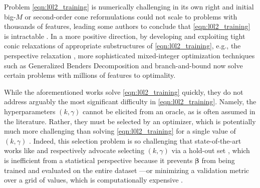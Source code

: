\documentclass[opre,nonblindrev]{informs3} %
\begin{document}
Problem \eqref{eqn:l0l2_training} is numerically challenging in its own right and initial big-$M$ \citep{bertsimas2016best} or second-order cone \citep{miyashiro2015mixed} reformulations could not scale to problems with thousands of features, leading some authors to conclude that \eqref{eqn:l0l2_training} is intractable \citep[][]{hastie2020best}. In a more positive direction, by developing and exploiting tight conic relaxations of appropriate substructures of \eqref{eqn:l0l2_training}, e.g., the perspective relaxation \citep{ceria1999convex, frangioni2006perspective,gunluk2010perspective}%
, more sophisticated mixed-integer optimization techniques such as Generalized Benders Decomposition \citep{bertsimas2020sparse} and branch-and-bound \citep{hazimeh2021sparse} now solve certain problems with millions of features to optimality.%


While the aforementioned works solve \eqref{eqn:l0l2_training} quickly, they do not address arguably the most significant difficulty in \eqref{eqn:l0l2_training}. Namely, the hyperparameters $(k, \gamma)$ cannot be elicited from an oracle, as is often assumed in the literature. Rather, they must be selected by an optimizer, which is potentially much more challenging than solving \eqref{eqn:l0l2_training} for a single value of $(k, \gamma)$ \citep[]{hansen1992new}. Indeed, this selection problem is so challenging that state-of-the-art works like \cite{bertsimas2020sparse2} and  \cite{hazimeh2021sparse} respectively advocate selecting $(k, \gamma)$ via a hold-out set \citep[c.f.][]{devroye1979distribution}, which is inefficient from a statistical perspective because it prevents $\bm{\beta}$ from being trained and evaluated on the entire dataset \citep[][]{arlot2010survey}%
—or minimizing a validation metric over a grid of values, which is computationally expensive \citep[]{larochelle2007empirical}. %
\end{document}
